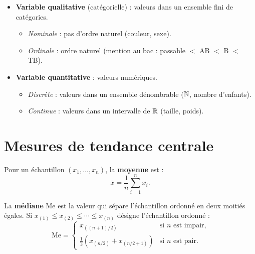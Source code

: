 \begin{definition}
\begin{itemize}
\item \textbf{Variable qualitative} (cat\'egorielle) : valeurs dans un ensemble fini de cat\'egories.
  \begin{itemize}
  \item \emph{Nominale} : pas d'ordre naturel (couleur, sexe).
  \item \emph{Ordinale} : ordre naturel (mention au bac : passable $<$ AB $<$ B $<$ TB).
  \end{itemize}
\item \textbf{Variable quantitative} : valeurs num\'eriques.
  \begin{itemize}
  \item \emph{Discr\`ete} : valeurs dans un ensemble d\'enombrable ($\mathbb{N}$, nombre d'enfants).
  \item \emph{Continue} : valeurs dans un intervalle de $\mathbb{R}$ (taille, poids).
  \end{itemize}
\end{itemize}
\end{definition}

\section{Mesures de tendance centrale}

\begin{definition}
Pour un \'echantillon $(x_1,\ldots,x_n)$, la \textbf{moyenne} est :
\[
\bar{x} = \frac{1}{n}\sum_{i=1}^{n} x_i.
\]
\end{definition}

\begin{definition}[M\'ediane]
La \textbf{m\'ediane} $\mathrm{Me}$ est la valeur qui s\'epare l'\'echantillon ordonn\'e en deux moiti\'es \'egales. Si $x_{(1)}\leq x_{(2)}\leq\cdots\leq x_{(n)}$ d\'esigne l'\'echantillon ordonn\'e :
\[
\mathrm{Me} = \begin{cases}
x_{((n+1)/2)} & \text{si } n \text{ est impair,}\\
\frac{1}{2}\left(x_{(n/2)}+x_{(n/2+1)}\right) & \text{si } n \text{ est pair.}
\end{cases}
\]
\end{definition}

